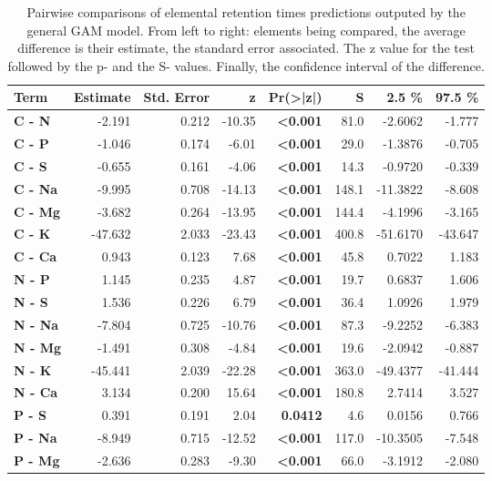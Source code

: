 \begin{table}[H]
\centering
\caption{Pairwise comparisons of elemental retention times predictions outputed by the general GAM model. From left to right: elements being compared, the average difference is their estimate, the standard error associated. The z value for the test followed by the p- and the S- values. Finally, the confidence interval of the difference. }
\centering
\begin{tabular}[t]{>{}lrrr>{}rrrr}
\toprule
\textbf{Term} & \textbf{Estimate} & \textbf{Std. Error} & \textbf{z} & \textbf{Pr(>|z|)} & \textbf{S} & \textbf{2.5 \%} & \textbf{97.5 \%}\\
\midrule
\textbf{C - N} & -2.191 & 0.212 & -10.35 & \textbf{<0.001} & 81.0 & -2.6062 & -1.777\\
\textbf{C - P} & -1.046 & 0.174 & -6.01 & \textbf{<0.001} & 29.0 & -1.3876 & -0.705\\
\textbf{C - S} & -0.655 & 0.161 & -4.06 & \textbf{<0.001} & 14.3 & -0.9720 & -0.339\\
\textbf{C - Na} & -9.995 & 0.708 & -14.13 & \textbf{<0.001} & 148.1 & -11.3822 & -8.608\\
\textbf{C - Mg} & -3.682 & 0.264 & -13.95 & \textbf{<0.001} & 144.4 & -4.1996 & -3.165\\
\textbf{C - K} & -47.632 & 2.033 & -23.43 & \textbf{<0.001} & 400.8 & -51.6170 & -43.647\\
\textbf{C - Ca} & 0.943 & 0.123 & 7.68 & \textbf{<0.001} & 45.8 & 0.7022 & 1.183\\
\textbf{N - P} & 1.145 & 0.235 & 4.87 & \textbf{<0.001} & 19.7 & 0.6837 & 1.606\\
\textbf{N - S} & 1.536 & 0.226 & 6.79 & \textbf{<0.001} & 36.4 & 1.0926 & 1.979\\
\textbf{N - Na} & -7.804 & 0.725 & -10.76 & \textbf{<0.001} & 87.3 & -9.2252 & -6.383\\
\textbf{N - Mg} & -1.491 & 0.308 & -4.84 & \textbf{<0.001} & 19.6 & -2.0942 & -0.887\\
\textbf{N - K} & -45.441 & 2.039 & -22.28 & \textbf{<0.001} & 363.0 & -49.4377 & -41.444\\
\textbf{N - Ca} & 3.134 & 0.200 & 15.64 & \textbf{<0.001} & 180.8 & 2.7414 & 3.527\\
\textbf{P - S} & 0.391 & 0.191 & 2.04 & \textbf{0.0412} & 4.6 & 0.0156 & 0.766\\
\textbf{P - Na} & -8.949 & 0.715 & -12.52 & \textbf{<0.001} & 117.0 & -10.3505 & -7.548\\
\textbf{P - Mg} & -2.636 & 0.283 & -9.30 & \textbf{<0.001} & 66.0 & -3.1912 & -2.080\\

\end{tabular}
\end{table}

